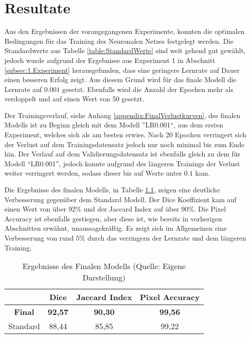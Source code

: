 \chapter{Resultate}
Aus den Ergebnissen der vorangegangenen Experimente, konnten die optimalen Bedingungen für das Training des Neuronalen Netzes festgelegt werden. Die Standardwerte aus Tabelle \ref{table:StandardWerte} sind weit gehend gut gewählt, jedoch wurde aufgrund der Ergebnisse aus Experiment 1 in Abschnitt \ref{subsec:1.Experiment} herausgefunden, dass eine geringere Lernrate auf Dauer einen besseren Erfolg zeigt. Aus diesem Grund wird für das finale Modell die Lernrate auf $0.001$ gesetzt. Ebenfalls wird die Anzahl der Epochen mehr als verdoppelt und auf einen Wert von 50 gesetzt.

Der Trainingsverlauf, siehe Anhang \ref{appendix:FinalVerlustkurven}, des finalen Modells ist zu Beginn gleich mit dem Modell ''LR0.001``, aus dem ersten Experiment, welches sich als am besten erwies. Nach 20 Epochen verringert sich der Verlust  auf dem Trainingsdatensatz jedoch nur noch minimal bis zum Ende hin. Der Verlauf auf dem Validierungsdatensatz ist ebenfalls gleich zu dem für Modell ``LR0.001'', jedoch konnte aufgrund des längeren Trainings der Verlust weiter verringert werden, sodass dieser bis auf Werte unter $0.1$ kam. 

Die Ergebnisse des finalen Modells, in Tabelle \ref{table:FinalErgebnisse}, zeigen eine deutliche Verbesserung gegenüber dem Standard Modell. Der Dice Koeffizient kam auf einen Wert von über $92\%$ und der Jaccard Index auf über $90\%$. Die Pixel Accuracy ist ebenfalls gestiegen, aber diese ist, wie bereits in vorherigen Abschnitten erwähnt, unaussagekräftig. Es zeigt sich im Allgemeinen eine Verbesserung von rund $5\%$ durch das verringern der Lernrate und dem längeren Training.
\begin{table}[!h]
	\centering
	\begin{tabular}{|c|c|c|c|}
		\hline
		& Dice 				& Jaccard Index 	& Pixel Accuracy \\
		\hline
		\textbf{Final}		& \textbf{92,57} 	& \textbf{90,30}  	& \textbf{99,56}  \\
		\hline
		Standard		& 88,44 			& 85,85  			& 99,22  \\
		\hline
	\end{tabular}
	\caption{Ergebnisse des Finalen Modells (Quelle: Eigene Darstellung)}
	\label{table:FinalErgebnisse}
\end{table}

